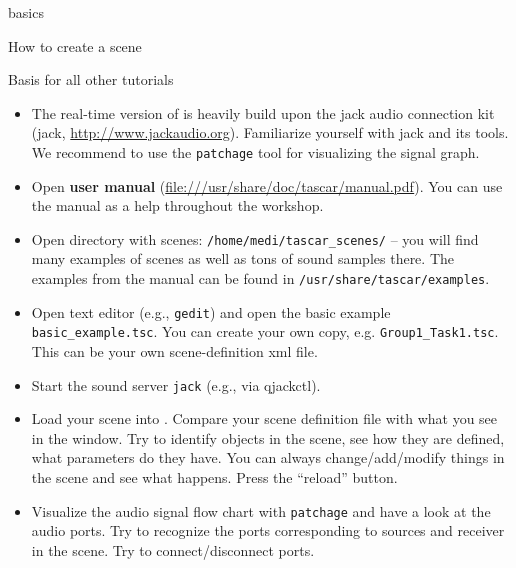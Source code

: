 \documentclass[11pt,a4paper,twoside]{article}
\begin{document}
\setcounter{tutorial}{-1}
\begin{tutorial}{\tascar{} basics}

  \begin{learnitems}
  \item How to create a scene
  \end{learnitems}

  \begin{appitems}
  \item Basis for all other tutorials
  \end{appitems}

\end{tutorial}

\begin{itemize}
\item The real-time version of \tascar{} is heavily build upon the
  jack audio connection kit (jack,
  \url{http://www.jackaudio.org}). Familiarize yourself with jack
  and its tools. We recommend to use the \verb!patchage! tool for
  visualizing the signal graph.
\item Open \textbf{user manual}
  (\url{file:///usr/share/doc/tascar/manual.pdf}). You
  can use the manual as a help throughout the workshop.

\item Open directory with \tascar{} scenes:
  \verb!/home/medi/tascar_scenes/! -- you will find many examples of
  \tascar{} scenes as well as tons of sound samples there. The
  examples from the manual can be found in
  \verb!/usr/share/tascar/examples!.

\item Open text editor (e.g., \verb!gedit!) and open the basic example
  \verb!basic_example.tsc!. You can create your own copy, e.g.
  \verb!Group1_Task1.tsc!. This can be your own scene-definition xml
  file.

\item Start the sound server \verb!jack! (e.g., via qjackctl).

\item Load your scene into \tascar{}. Compare your scene definition
  file with what you see in the \tascar{} window. Try to identify
  objects in the scene, see how they are defined, what parameters do
  they have. You can always change/add/modify things in the scene and
  see what happens. Press the ``reload'' button.

\item Visualize the audio signal flow chart with \verb!patchage!  and
  have a look at the audio ports. Try to recognize the ports
  corresponding to sources and receiver in the scene. Try to
  connect/disconnect ports.


\end{itemize}
\end{document}
